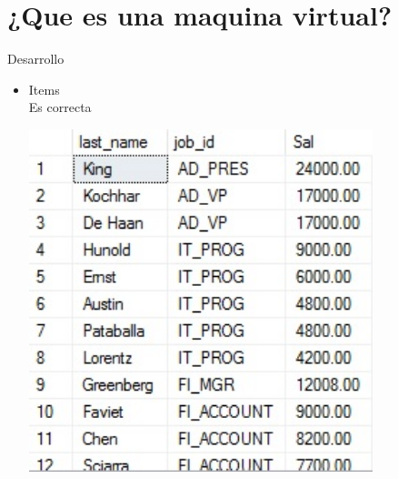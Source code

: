 \section{¿Que es una maquina virtual?} 
Desarrollo

\begin{itemize}
	\item Items
	\\Es correcta
	\begin{center}
	\includegraphics[width=10cm]{./Imagenes/actividad0101} 
	\end{center}



\end{itemize} 